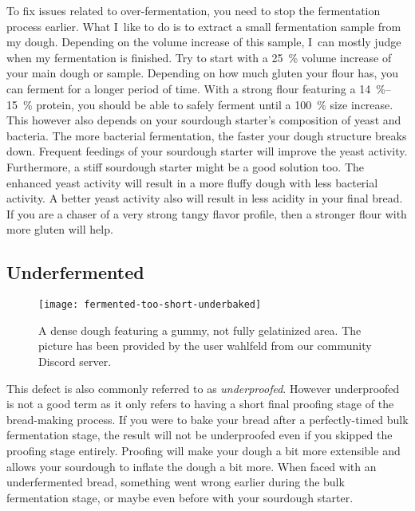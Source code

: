 To fix issues related to over-fermentation, you need to stop the fermentation process
earlier. What I~like to do is to extract a small fermentation sample from my dough.
Depending on the volume increase of this sample, I~can mostly judge when my fermentation
is finished. Try to start with a \qty{25}{\percent} volume increase of your
main dough or sample.  Depending on how much gluten your flour has, you can
ferment for a longer period of time.  With a strong flour featuring a
\qtyrange{14}{15}{\percent} protein, you should be able to safely ferment
until a \qty{100}{\percent} size increase. This however also depends on your
sourdough starter's composition of yeast and bacteria. The more bacterial fermentation,
the faster your dough structure breaks down. Frequent feedings of your sourdough
starter will improve the yeast activity. Furthermore, a stiff sourdough starter
might be a good solution too. The enhanced yeast activity will result in a more fluffy
dough with less bacterial activity. A better yeast activity also will result
in less acidity in your final bread. If you are a chaser of a very strong tangy
flavor profile, then a stronger flour with more gluten will help.


\subsection{Underfermented}

\begin{figure}
  \texttt{[image: fermented-too-short-underbaked]}
  \caption[Underfermented bread]{A dense dough featuring a gummy, not fully
      gelatinized area.  The picture has been provided by the user wahlfeld
      from our community Discord server.}%
  \label{fig:fermented-too-short-underbaked}
\end{figure}

This defect is also commonly referred to as \emph{underproofed}. However underproofed
is not a good term as it only refers to having a short final
proofing stage of the bread-making process.
If you were to bake your bread after a perfectly-timed bulk fermentation stage,
the result will not be underproofed even if you skipped the proofing stage entirely.
Proofing will make your dough a bit more extensible and allows your sourdough
to inflate the dough a bit more. When faced with an underfermented bread, something
went wrong earlier during the bulk fermentation stage, or maybe even
before with your sourdough starter.

